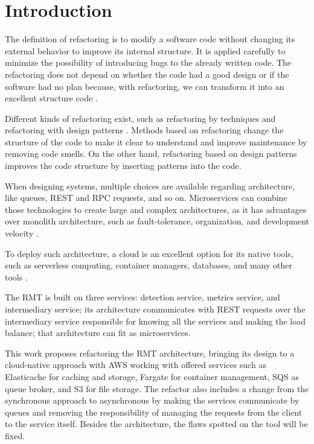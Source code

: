 \chapter{Introduction}%
\label{chpt-intro}
The definition of refactoring is to modify a software code without changing its external behavior to improve its internal structure. It is applied carefully to minimize the possibility of introducing bugs to the already written code. The refactoring does not depend on whether the code had a good design or if the software had no plan because, with refactoring, we can transform it into an excellent structure code \cite{fowler2018refactoring}.

Different kinds of refactoring exist, such as refactoring by techniques \cite{fowler2018refactoring} and refactoring with design patterns \cite{kerievsky2005refactoring}. Methods based on refactoring change the structure of the code to make it clear to understand and improve maintenance by removing code smells. On the other hand, refactoring based on design patterns improves the code structure by inserting patterns into the code.

When designing systems, multiple choices are available regarding architecture, like queues, REST and RPC requests, and so on. Microservices can combine those technologies to create large and complex architectures, as it has advantages over monolith architecture, such as fault-tolerance, organization, and development velocity \cite{microservices-comuni}.

To deploy such architecture, a cloud is an excellent option for its native tools, such as serverless computing, container managers, databases, and many other tools \cite{balalaie2016}.

The RMT is built on three services: detection service, metrics service, and intermediary service; its architecture communicates with REST requests over the intermediary service responsible for knowing all the services and making the load balance; that architecture can fit as microservices.

This work proposes refactoring the RMT architecture, bringing its design to a cloud-native approach with AWS working with offered services such as Elasticache for caching and storage, Fargate for container management, SQS as queue broker, and S3 for file storage. The refactor also includes a change from the synchronous approach to asynchronous by making the services communicate by queues and removing the responsibility of managing the requests from the client to the service itself. Besides the architecture, the flaws spotted on the tool will be fixed.

